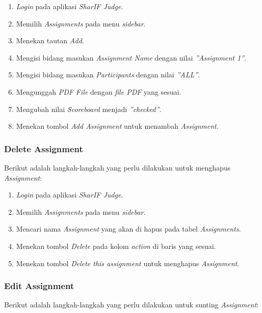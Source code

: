 \begin{enumerate}
	\item \textit{Login} pada aplikasi \textit{SharIF Judge}.
	\item Memilih \textit{Assignments} pada menu \textit{sidebar}.
	\item Menekan tautan \textit{Add}.
	\item Mengisi bidang masukan \textit{Assignment Name} dengan nilai \textit{''Assignment 1''}.
	\item Mengisi bidang masukan \textit{Participants} dengan nilai \textit{''ALL''}.
	\item Mengunggah \textit{PDF File} dengan \textit{file PDF} yang sesuai.
	\item Mengubah nilai \textit{Scoreboard} menjadi \textit{''checked''}.
	\item Menekan tombol \textit{Add Assignment} untuk menambah \textit{Assignment}.
\end{enumerate}

\subsubsection{Delete Assignment}
\label{subsubsec:skenario_delete_assignment}
Berikut adalah langkah-langkah yang perlu dilakukan untuk menghapus \textit{Assignment}:

\begin{enumerate}
	\item \textit{Login} pada aplikasi \textit{SharIF Judge}.
	\item Memilih \textit{Assignments} pada menu \textit{sidebar}.
	\item Mencari nama \textit{Assignment} yang akan di hapus pada tabel \textit{Assignments}.
	\item Menekan tombol \textit{Delete} pada kolom \textit{action} di baris yang sesuai.
	\item Menekan tombol \textit{Delete this assignment} untuk menghapus \textit{Assignment}.
\end{enumerate}

\subsubsection{Edit Assignment}
\label{subsubsec:skenario_edit_assignment}
Berikut adalah langkah-langkah yang perlu dilakukan untuk sunting \textit{Assignment}:

